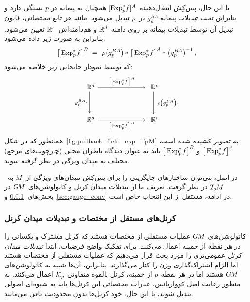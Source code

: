 با این حال، پس‌کِش انتقال‌دهنده $[\operatorname{Exp}^*_p\mkern-2mu f]^A$ همچنان به پیمانه در $p$ بستگی دارد و بنابراین تحت تبدیلات پیمانه $g_p^{BA}$ در~$p$ تبدیل می‌شود.
مانند هر تابع مختصاتی، قانون تبدیل آن توسط تبدیلات پیمانه بر روی دامنه~$\mathbb{R}^d$ و هم‌دامنه‌اش~$\mathbb{R}^c$ تعیین می‌شود.
بنابراین به صورت زیر داده می‌شود:
\begin{align}\label{eq:trafo_law_transporter_pullback}
	\big[ \operatorname{Exp}^*_p\mkern-2mu f \big]^B\ =\ \rho\big( g_p^{BA} \big) \circ \big[ \operatorname{Exp}^*_p\mkern-2mu f \big]^A \circ \big(g_p^{BA} \big)^{-1} \,,
\end{align}
که توسط نمودار جابجایی زیر خلاصه می‌شود:
\begin{equation}\label{cd:pullback_trafo}
	\begin{tikzcd}[column sep=70pt, row sep=32pt, font=\normalsize]
		\R^d
		\arrow[d, "g_p^{BA} \cdot\,"']
		\arrow[r, "{\big[\mkern-1mu \Expspf \big]^A}"]
		&
		\R^c
		\arrow[d, "\ \rho\big(g_p^{BA}\big) \cdot"]
		\\
		\R^d
		\arrow[r, "{\big[\mkern-1mu \Expspf \big]^B}"']
		&
		\R^c
	\end{tikzcd}
\end{equation}
همانطور که در شکل~\ref{fig:pullback_field_exp_TpM} به تصویر کشیده شده است، $\big[\operatorname{Exp}^*_p\mkern-2mu f\big]^A$ و $\big[\operatorname{Exp}^*_p\mkern-2mu f\big]^B$ باید به عنوان دیدگاه ناظران محلی (چارچوب‌های مرجع) مختلف به میدان ویژگی در نظر گرفته شوند.

در اصل، می‌توان ساختارهای جایگزینی را برای پس‌کِش میدان‌های ویژگی از~$M$ به~$T_{\mkern-1.5mu p}\mkern-.5muM$ در نظر گرفت.
تعریف ما از تبدیلات میدان کرنل و کانولوشن‌های $G\mkern-1.4muM$ در بخش‌های~\ref{sec:kernel_field_trafos} و~\ref{sec:gauge_conv} در ادامه، مستقل از این انتخاب خاص است.

\subsubsection{کرنل‌های مستقل از مختصات و تبدیلات میدان کرنل}
\label{sec:kernel_field_trafos}

کانولوشن‌های $G\mkern-1.4muM$ عملیات مستقلی از مختصات هستند که کرنل مشترک و یکسانی را در هر نقطه از خمینه اعمال می‌کنند.
برای تفکیک واضح فرضیات، ابتدا \emph{تبدیلات میدان کرنل} عمومی‌تری را مورد بحث قرار می‌دهیم که عملیات مستقلی از مختصات هستند اما الزام اشتراک‌گذاری وزن را کنار می‌گذارند.
بنابراین، آن‌ها شبیه به کانولوشن‌های $G\mkern-1.4muM$ هستند اما در هر نقطه~$p$ از خمینه، کرنل بالقوه متفاوتی $\mathcal{K}_p$ اعمال می‌کنند.
به منظور رعایت اصل کوواریانس، عبارات مختصاتی این کرنل‌ها باید به شیوه‌ای اصولی تبدیل شوند، با این حال، خود کرنل‌ها بدون محدودیت باقی می‌مانند.

